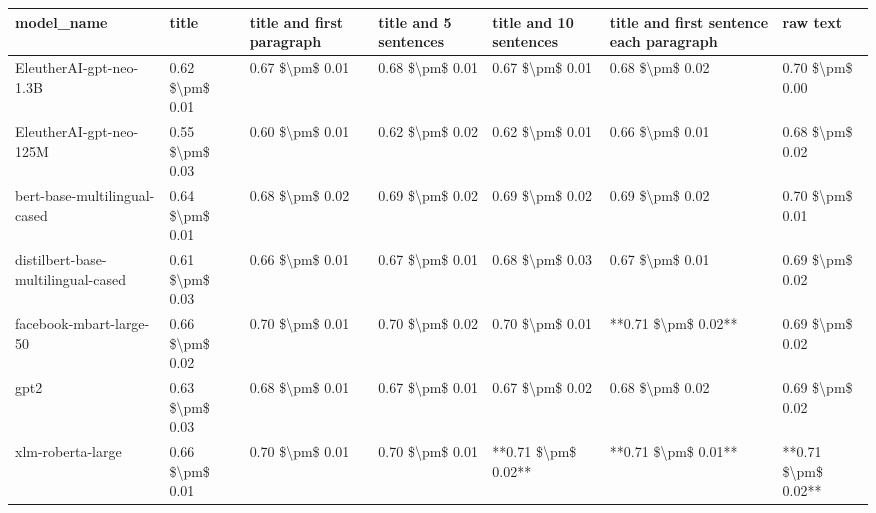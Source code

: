 \begin{tabular}{lllllll}
\toprule
                        model\_name &           title & title and first paragraph & title and 5 sentences & title and 10 sentences & title and first sentence each paragraph &            raw text \\
\midrule
           EleutherAI-gpt-neo-1.3B & 0.62 \$\textbackslash pm\$ 0.01 &           0.67 \$\textbackslash pm\$ 0.01 &       0.68 \$\textbackslash pm\$ 0.01 &        0.67 \$\textbackslash pm\$ 0.01 &                         0.68 \$\textbackslash pm\$ 0.02 &     0.70 \$\textbackslash pm\$ 0.00 \\
           EleutherAI-gpt-neo-125M & 0.55 \$\textbackslash pm\$ 0.03 &           0.60 \$\textbackslash pm\$ 0.01 &       0.62 \$\textbackslash pm\$ 0.02 &        0.62 \$\textbackslash pm\$ 0.01 &                         0.66 \$\textbackslash pm\$ 0.01 &     0.68 \$\textbackslash pm\$ 0.02 \\
      bert-base-multilingual-cased & 0.64 \$\textbackslash pm\$ 0.01 &           0.68 \$\textbackslash pm\$ 0.02 &       0.69 \$\textbackslash pm\$ 0.02 &        0.69 \$\textbackslash pm\$ 0.02 &                         0.69 \$\textbackslash pm\$ 0.02 &     0.70 \$\textbackslash pm\$ 0.01 \\
distilbert-base-multilingual-cased & 0.61 \$\textbackslash pm\$ 0.03 &           0.66 \$\textbackslash pm\$ 0.01 &       0.67 \$\textbackslash pm\$ 0.01 &        0.68 \$\textbackslash pm\$ 0.03 &                         0.67 \$\textbackslash pm\$ 0.01 &     0.69 \$\textbackslash pm\$ 0.02 \\
           facebook-mbart-large-50 & 0.66 \$\textbackslash pm\$ 0.02 &           0.70 \$\textbackslash pm\$ 0.01 &       0.70 \$\textbackslash pm\$ 0.02 &        0.70 \$\textbackslash pm\$ 0.01 &                     **0.71 \$\textbackslash pm\$ 0.02** &     0.69 \$\textbackslash pm\$ 0.02 \\
                              gpt2 & 0.63 \$\textbackslash pm\$ 0.03 &           0.68 \$\textbackslash pm\$ 0.01 &       0.67 \$\textbackslash pm\$ 0.01 &        0.67 \$\textbackslash pm\$ 0.02 &                         0.68 \$\textbackslash pm\$ 0.02 &     0.69 \$\textbackslash pm\$ 0.02 \\
                 xlm-roberta-large & 0.66 \$\textbackslash pm\$ 0.01 &           0.70 \$\textbackslash pm\$ 0.01 &       0.70 \$\textbackslash pm\$ 0.01 &    **0.71 \$\textbackslash pm\$ 0.02** &                     **0.71 \$\textbackslash pm\$ 0.01** & **0.71 \$\textbackslash pm\$ 0.02** \\
\bottomrule
\end{tabular}

